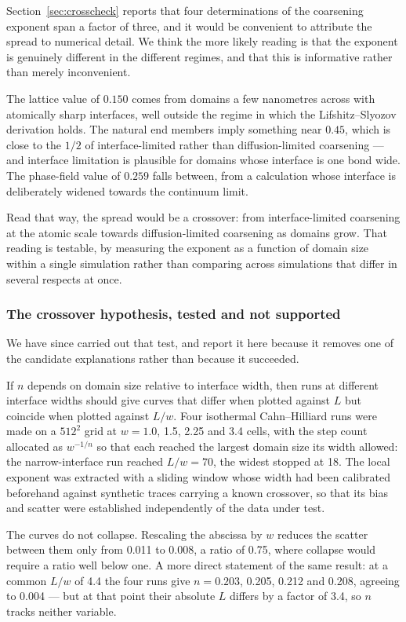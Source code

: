 \documentclass[11pt,a4paper]{article}
\begin{document}
Section~\ref{sec:crosscheck} reports that four determinations of the coarsening
exponent span a factor of three, and it would be convenient to attribute the
spread to numerical detail. We think the more likely reading is that the
exponent is genuinely different in the different regimes, and that this is
informative rather than merely inconvenient.

The lattice value of $0.150$ comes from domains a few nanometres across with
atomically sharp interfaces, well outside the regime in which the
Lifshitz--Slyozov derivation holds. The natural end members imply something near
$0.45$, which is close to the $1/2$ of interface-limited rather than
diffusion-limited coarsening --- and interface limitation is plausible for
domains whose interface is one bond wide. The phase-field value of $0.259$ falls
between, from a calculation whose interface is deliberately widened towards the
continuum limit.

Read that way, the spread would be a crossover: from interface-limited
coarsening at the atomic scale towards diffusion-limited coarsening as domains
grow. That reading is testable, by measuring the exponent as a function of
domain size within a single simulation rather than comparing across
simulations that differ in several respects at once.

\subsubsection*{The crossover hypothesis, tested and not supported}

We have since carried out that test, and report it here because it removes one
of the candidate explanations rather than because it succeeded.

If $n$ depends on domain size relative to interface width, then runs at
different interface widths should give curves that differ when plotted against
$L$ but coincide when plotted against $L/w$. Four isothermal Cahn--Hilliard
runs were made on a $512^2$ grid at $w = 1.0$, 1.5, 2.25 and 3.4 cells, with the
step count allocated as $w^{-1/n}$ so that each reached the largest domain size
its width allowed: the narrow-interface run reached $L/w = 70$, the widest
stopped at 18. The local exponent was extracted with a sliding window whose
width had been calibrated beforehand against synthetic traces carrying a known
crossover, so that its bias and scatter were established independently of the
data under test.

The curves do not collapse. Rescaling the abscissa by $w$ reduces the scatter
between them only from 0.011 to 0.008, a ratio of 0.75, where collapse would
require a ratio well below one. A more direct statement of the same result: at
a common $L/w$ of 4.4 the four runs give $n = 0.203$, 0.205, 0.212 and 0.208,
agreeing to 0.004 --- but at that point their absolute $L$ differs by a factor
of 3.4, so $n$ tracks neither variable.
\end{document}
